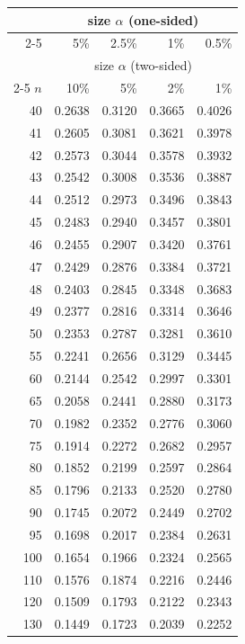\begin{minipage}[t]{0.49\textwidth}
	\centering
	\setlength{\tabcolsep}{10pt}
	\renewcommand{\arraystretch}{1.03}
	\begin{tabular}{rrrrr}
		& \multicolumn{4}{c}{size $\alpha$ (one-sided)} \\
		\cline{2-5}
		& 5\% & 2.5\% & 1\% & 0.5\% \\
		& \multicolumn{4}{c}{size $\alpha$ (two-sided)} \\
		\cline{2-5}
		$n$ & 10\% & 5\% & 2\% & 1\% \\
		\midrule
		40 & 0.2638 & 0.3120 & 0.3665 & 0.4026 \\
		41 & 0.2605 & 0.3081 & 0.3621 & 0.3978 \\
		42 & 0.2573 & 0.3044 & 0.3578 & 0.3932 \\
		43 & 0.2542 & 0.3008 & 0.3536 & 0.3887 \\
		44 & 0.2512 & 0.2973 & 0.3496 & 0.3843 \\
		45 & 0.2483 & 0.2940 & 0.3457 & 0.3801 \\
		46 & 0.2455 & 0.2907 & 0.3420 & 0.3761 \\
		47 & 0.2429 & 0.2876 & 0.3384 & 0.3721 \\
		48 & 0.2403 & 0.2845 & 0.3348 & 0.3683 \\
		49 & 0.2377 & 0.2816 & 0.3314 & 0.3646 \\[5pt]
		50 & 0.2353 & 0.2787 & 0.3281 & 0.3610 \\
		55 & 0.2241 & 0.2656 & 0.3129 & 0.3445 \\
		60 & 0.2144 & 0.2542 & 0.2997 & 0.3301 \\
		65 & 0.2058 & 0.2441 & 0.2880 & 0.3173 \\
		70 & 0.1982 & 0.2352 & 0.2776 & 0.3060 \\
		75 & 0.1914 & 0.2272 & 0.2682 & 0.2957 \\
		80 & 0.1852 & 0.2199 & 0.2597 & 0.2864 \\
		85 & 0.1796 & 0.2133 & 0.2520 & 0.2780 \\
		90 & 0.1745 & 0.2072 & 0.2449 & 0.2702 \\
		95 & 0.1698 & 0.2017 & 0.2384 & 0.2631 \\[5pt]
		100 & 0.1654 & 0.1966 & 0.2324 & 0.2565 \\
		110 & 0.1576 & 0.1874 & 0.2216 & 0.2446 \\
		120 & 0.1509 & 0.1793 & 0.2122 & 0.2343 \\
		130 & 0.1449 & 0.1723 & 0.2039 & 0.2252 \\

\end{tabular}
\end{minipage}
